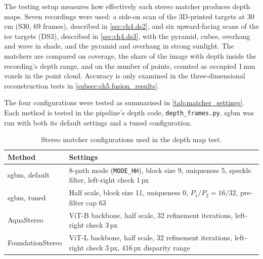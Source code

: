 The testing setup measures how effectively each stereo matcher produces depth maps. Seven recordings were used: a side-on scan of the
3D-printed targets at 30\,cm (S30, 69 frames), described in \autoref{sec:ch4.ds2}, and six upward-facing scans of the ice targets (DS3), described in \autoref{sec:ch4.ds3}, with
the pyramid, cubes, overhang and wave in shade, and the pyramid and overhang in strong sunlight.
The matchers are compared on coverage, the share of the image with depth inside the recording's depth range, and
on the number of points, counted as occupied 1\,mm voxels in the point cloud.
Accuracy is only examined in the three-dimensional reconstruction tests in \autoref{subsec:ch5.fusion_results}.

The four configurations were tested as summarised in \autoref{tab:matcher_settings}. 
Each method is tested in the pipeline's depth code, \texttt{depth\_frames.py}. 
\Gls{sgbm} was run with both its default settings and a tuned configuration. 

\begin{table}[htbp]
    \centering
    \caption{Stereo matcher configurations used in the depth map test.}
    \label{tab:matcher_settings}
    \begin{tabularx}{\textwidth}{@{}lX@{}}
        \toprule
        \textbf{Method} & \textbf{Settings} \\
        \midrule
        \acrshort{sgbm}, default    & 8-path mode (\texttt{MODE\_HH}), block size 9, uniqueness 5,
                           speckle filter, left-right check 1\,px \\
        \acrshort{sgbm}, tuned      & Half scale, block size 11, uniqueness 0,
                           $P_1/P_2 = 16/32$, pre-filter cap 63 \\
        AquaStereo       & ViT-B backbone, half scale, 32 refinement iterations,
                           left-right check 3\,px \\
        FoundationStereo & ViT-L backbone, half scale, 32 refinement iterations,
                           left-right check 3\,px, 416\,px disparity range \\
        \bottomrule
    \end{tabularx}
\end{table}






